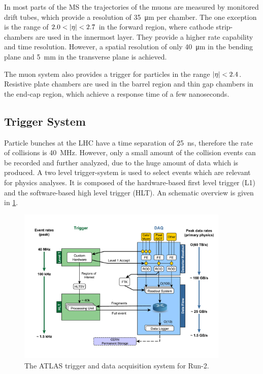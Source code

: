 In most parts of the MS the trajectories of the muons are measured by monitored drift tubes,  which provide a resolution
of \SI{35}{\um} per chamber.
The one exception is the range of $2.0 < \left|\eta\right| < 2.7$ in the forward region, where cathode strip-chambers are used
in the innermost layer.
They provide a higher rate capability and time resolution.
However, a spatial resolution of only \SI{40}{\um} in the bending plane and \SI{5}{\mm} in the
transverse plane is achieved.

The muon system also provides a trigger for particles in the range $\left|\eta\right| < 2.4$.
Resistive plate chambers are used in the barrel region and thin gap chambers in the end-cap region, which
achieve a response time of a few nanoseconds.

\subsection{Trigger System}\label{sub:setup:trigger}

Particle bunches at the LHC have a time separation of \SI{25}{\ns}, therefore the rate of collisions is \SI{40}{\MHz}.
However, only a small amount of the collision events can be recorded and further analyzed, due to the huge amount of data which is produced.
A two level trigger-system is used to select events which are relevant for physics analyses.
It is composed of the hardware-based first level trigger (L1) and the software-based high level trigger (HLT).
An schematic overview is given in \cref{fig:setup:trigger}.

\begin{figure}[htb]
    \centering
    \includegraphics[width=0.9\textwidth]{./figures/setup/trigger.pdf}
    \caption{The ATLAS trigger and data acquisition system for Run-2.\cite{ImageTrigger}}\label{fig:setup:trigger}
\end{figure}

